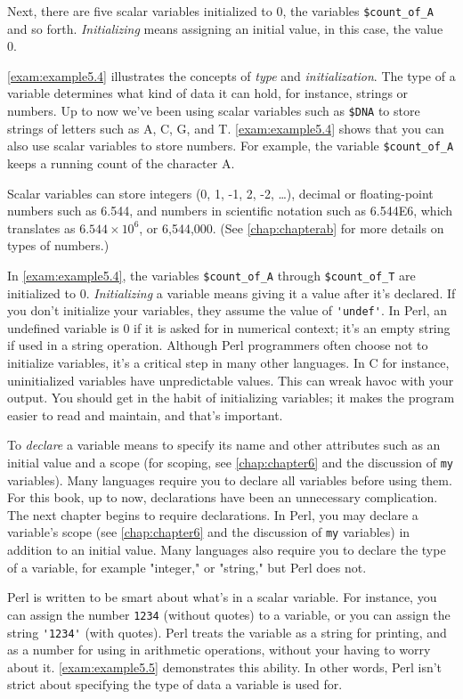 Next, there are five scalar variables initialized to 0, the variables \verb|$count_of_A| and so forth. \textit{Initializing} means assigning an initial value, in this case, the value 0. 

\autoref{exam:example5.4} illustrates the concepts of \textit{type} and \textit{initialization}. The type of a variable determines what kind of data it can hold, for instance, strings or numbers. Up to now we've been using scalar variables such as \verb|$DNA| to store strings of letters such as A, C, G, and T. \autoref{exam:example5.4} shows that you can also use scalar variables to store numbers. For example, the variable \verb|$count_of_A| keeps a running count of the character A.

Scalar variables can store integers (0, 1, -1, 2, -2, \ldots), decimal or floating-point numbers such as 6.544, and numbers in scientific notation such as 6.544E6, which translates as $6.544 \times 10^6$, or 6,544,000. (See \autoref{chap:chapterab} for more details on types of numbers.)

In \autoref{exam:example5.4}, the variables \verb|$count_of_A| through \verb|$count_of_T| are initialized to 0. \textit{Initializing} a variable means giving it a value after it's declared. If you don't initialize your variables, they assume the value of \verb|'undef'|. In Perl, an undefined variable is 0 if it is asked for in numerical context; it's an empty string if used in a string operation. Although Perl programmers often choose not to initialize variables, it's a critical step in many other languages. In C for instance, uninitialized variables have unpredictable values. This can wreak havoc with your output. You should get in the habit of initializing variables; it makes the program easier to read and maintain, and that's important.

To \textit{declare} a variable means to specify its name and other attributes such as an initial value and a scope (for scoping, see \autoref{chap:chapter6} and the discussion of \verb|my| variables). Many languages require you to declare all variables before using them. For this book, up to now, declarations have been an unnecessary complication. The next chapter begins to require declarations. In Perl, you may declare a variable's scope (see \autoref{chap:chapter6} and the discussion of \verb|my| variables) in addition to an initial value.  Many languages also require you to declare the type of a variable, for example "integer," or "string," but Perl does not.

Perl is written to be smart about what's in a scalar variable. For instance, you can assign the number \verb|1234| (without quotes) to a variable, or you can assign the string \verb|'1234'| (with quotes). Perl treats the variable as a string for printing, and as a number for using in arithmetic operations, without your having to worry about it. \autoref{exam:example5.5} demonstrates this ability. In other words, Perl isn't strict about specifying the type of data a variable is used for. 


